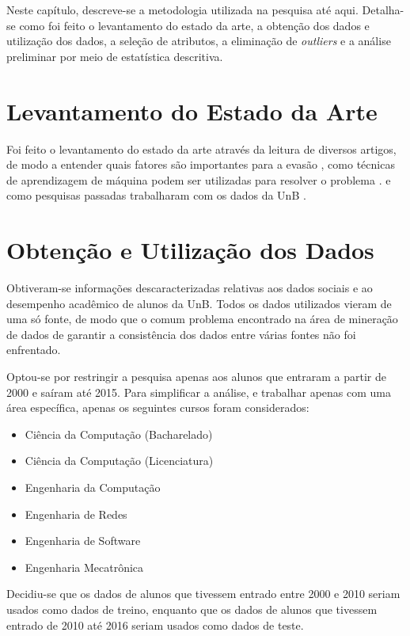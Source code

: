 Neste capítulo, descreve-se a metodologia utilizada na pesquisa até aqui. 
Detalha-se como foi feito o levantamento
do estado da arte, a obtenção dos dados e utilização dos dados, a seleção de
atributos, a eliminação de \textit{outliers} e a análise preliminar por meio de estatística
descritiva. 

\section{Levantamento do Estado da Arte}
Foi feito o levantamento do estado da arte através da leitura de diversos artigos, de
modo a entender quais fatores são importantes para a evasão \cite{adeodato}
\cite{hoed_fatores} \cite{dropout_finland}, como técnicas de
aprendizagem de máquina podem ser utilizadas para resolver o problema \cite{adeodato}
 \cite{data_mining_retention}.
e como pesquisas passadas trabalharam com os dados da UnB
\cite{manual_calouro} \cite{hoed_sobrevivencia}. 

\section{Obtenção e Utilização dos Dados}
Obtiveram-se informações descaracterizadas relativas aos dados sociais e ao
desempenho acadêmico de alunos da UnB. Todos os dados utilizados vieram de uma só
fonte, de modo que o comum problema encontrado na área de mineração de dados de
garantir a consistência dos dados entre várias fontes não foi enfrentado. 
\par Optou-se por restringir a pesquisa apenas aos alunos que entraram a partir de
2000 e saíram até 2015. Para simplificar a análise, e trabalhar apenas com uma área
específica, apenas os seguintes cursos foram considerados: 
\begin{itemize}
    \item Ciência da Computação (Bacharelado)
    \item Ciência da Computação (Licenciatura)
    \item Engenharia da Computação 
    \item Engenharia de Redes
    \item Engenharia de Software
    \item Engenharia Mecatrônica
\end{itemize}
\par Decidiu-se que os dados de alunos que tivessem entrado entre 2000 e 2010 seriam
usados como dados de treino, enquanto que os dados de alunos que tivessem entrado de
2010 até 2016 seriam usados como dados de teste.

